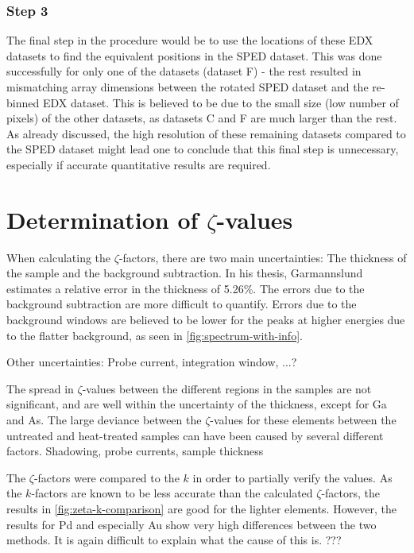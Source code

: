 \subsubsection{Step 3}

The final step in the procedure would be to use the locations of these EDX datasets to find the equivalent positions in the SPED dataset. This was done successfully for only one of the datasets (dataset F) - the rest resulted in mismatching array dimensions between the rotated SPED dataset and the re-binned EDX dataset. This is believed to be due to the small size (low number of pixels) of the other datasets, as datasets C and F are much larger than the rest. As already discussed, the high resolution of these remaining datasets compared to the SPED dataset might lead one to conclude that this final step is unnecessary, especially if accurate quantitative results are required.

\section{Determination of $\zeta$-values}

When calculating the $\zeta$-factors, there are two main uncertainties: The thickness of the sample and the background subtraction. In his thesis, Garmannslund estimates a relative error in the thickness of 5.26\%. The errors due to the background subtraction are more difficult to quantify. Errors due to the background windows are believed to be lower for the peaks at higher energies due to the flatter background, as seen in \cref{fig:spectrum-with-info}. %

Other uncertainties: Probe current, integration window, ...?

The spread in $\zeta$-values between the different regions in the samples are not significant, and are well within the uncertainty of the thickness, except for Ga and As. The large deviance between the $\zeta$-values for these elements between the untreated and heat-treated samples can have been caused by several different factors. Shadowing, probe currents, sample thickness%

The $\zeta$-factors were compared to the $k$ in order to partially verify the values. As the $k$-factors are known to be less accurate than the calculated $\zeta$-factors, the results in \cref{fig:zeta-k-comparison} are good for the lighter elements. However, the results for Pd and especially Au show very high differences between the two methods. It is again difficult to explain what the cause of this is. ???

